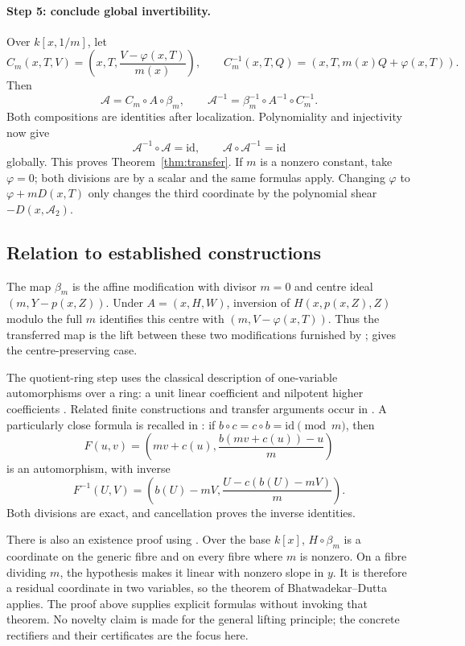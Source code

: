 \documentclass[11pt,a4paper]{article}
\newcommand{\id}{\mathrm{id}}
\newcommand{\comp}{\circ}
\begin{document}
\paragraph{Step 5: conclude global invertibility.}
Over $k[x,1/m]$, let
\[
C_m(x,T,V)=\left(x,T,\frac{V-\varphi(x,T)}{m(x)}\right),\qquad
C_m^{-1}(x,T,Q)=(x,T,m(x)Q+\varphi(x,T)).
\]
Then
\[
\mathcal A=C_m\comp A\comp\beta_m,\qquad
\mathcal A^{-1}=\beta_m^{-1}\comp A^{-1}\comp C_m^{-1}.
\]
Both compositions are identities after localization. Polynomiality and
injectivity now give
\[
\mathcal A^{-1}\comp\mathcal A=\id,
\qquad \mathcal A\comp\mathcal A^{-1}=\id
\]
globally. This proves Theorem~\ref{thm:transfer}.
If $m$ is a nonzero constant, take $\varphi=0$; both divisions are by a
scalar and the same formulas apply. Changing $\varphi$ to $\varphi+mD(x,T)$
only changes the third coordinate by the polynomial shear
$-D(x,\mathcal A_2)$.

\subsection{Relation to established constructions}

The map $\beta_m$ is the affine modification with divisor $m=0$ and
centre ideal $(m,Y-p(x,Z))$. Under $A=(x,H,W)$, inversion of
$H(x,p(x,Z),Z)$ modulo the full $m$ identifies this centre with
$(m,V-\varphi(x,T))$. Thus the transferred map is the lift between these
two modifications furnished by \cite[Proposition~2.1]{KZ};
\cite[Corollary~2.2]{KZ} gives the centre-preserving case.

The quotient-ring step uses the classical description of one-variable
automorphisms over a ring: a unit linear coefficient and nilpotent higher
coefficients \cite[Proposition~1]{EV}. Related finite constructions and
transfer arguments occur in \cite[Theorem~4 and \S5]{EV}.
A particularly close formula is recalled in \cite[\S1, Lemma~1.1]{EVM}:
if $b\circ c=c\circ b=\id\pmod m$, then
\[
F(u,v)=\left(mv+c(u),\frac{b(mv+c(u))-u}{m}\right)
\]
is an automorphism, with inverse
\[
F^{-1}(U,V)=\left(b(U)-mV,\frac{U-c(b(U)-mV)}m\right).
\]
Both divisions are exact, and cancellation proves the inverse identities.

There is also an existence proof using \cite{BD}. Over the base $k[x]$,
$H\circ\beta_m$ is a coordinate on the generic fibre and on every fibre
where $m$ is nonzero. On a fibre dividing $m$, the hypothesis makes it
linear with nonzero slope in $y$. It is therefore a residual coordinate
in two variables, so the theorem of Bhatwadekar--Dutta applies.
The proof above supplies explicit formulas without invoking that theorem.
No novelty claim is made for the general lifting principle; the concrete
rectifiers and their certificates are the focus here.
\end{document}
